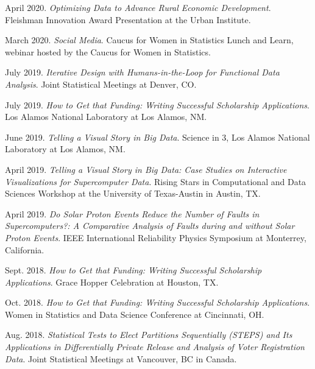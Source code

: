 \documentclass[11pt, letterpaper, roman]{moderncv} %
\begin{document}
\begin{etaremune}[topsep=0pt, itemsep=4pt, partopsep=0pt, parsep=0pt]
    \item April 2020. \textit{Optimizing Data to Advance Rural Economic Development}. Fleishman Innovation Award Presentation at the Urban Institute.
    
    \item March 2020. \textit{Social Media}. Caucus for Women in Statistics Lunch and Learn, webinar hosted by the Caucus for Women in Statistics.
    
    \item July 2019. \textit{Iterative Design with Humans-in-the-Loop for Functional Data Analysis}. Joint Statistical Meetings at Denver, CO. 
    
    \item July 2019. \textit{How to Get that Funding: Writing Successful Scholarship Applications}. Los Alamos National Laboratory at Los Alamos, NM.
    
    \item June 2019. \textit{Telling a Visual Story in Big Data}. Science in 3, Los Alamos National Laboratory at Los Alamos, NM. 
    
    \item April 2019. \textit{Telling a Visual Story in Big Data: Case Studies on Interactive Visualizations for Supercomputer Data}. Rising Stars in Computational and Data Sciences Workshop at the University of Texas-Austin in Austin, TX.
    
    \item April 2019. \textit{Do Solar Proton Events Reduce the Number of Faults in Supercomputers?: A Comparative Analysis of Faults during and without Solar Proton Events}. IEEE International Reliability Physics Symposium at Monterrey, California.
    
    \item Sept. 2018. \textit{How to Get that Funding: Writing Successful Scholarship Applications}. Grace Hopper Celebration at Houston, TX.
    
    \item Oct. 2018. \textit{How to Get that Funding: Writing Successful Scholarship Applications}. Women in Statistics and Data Science Conference at Cincinnati, OH.
    
    \item Aug. 2018. \textit{Statistical Tests to Elect Partitions Sequentially (STEPS) and Its Applications in Differentially Private Release and Analysis of Voter Registration Data}. Joint Statistical Meetings at Vancouver, BC in Canada.
    

\end{etaremune}
\end{document}
